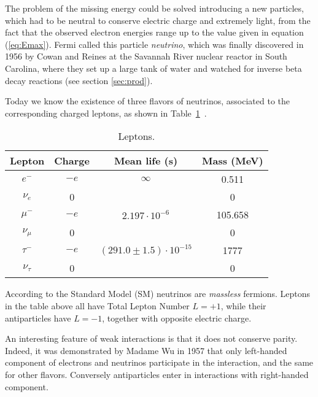 \documentclass{subnucbo}
\begin{document}
The problem of the missing energy could be solved introducing a new particles, which had to be neutral to conserve electric charge and extremely light, from the fact that the observed electron energies range up to the value given in equation (\ref{eq:Emax}).
Fermi called this particle \emph{neutrino}, which was finally discovered in 1956 by Cowan and Reines at the Savannah River nuclear reactor in South Carolina, where they set up a large tank of water and watched for inverse beta decay reactions (see section \ref{sec:prod}).

Today we know the existence of three flavors of neutrinos, associated to the corresponding charged leptons, as shown in Table~\ref{tab:classification}~\cite{ref:cott}.
\begin{table}[H]
\begin{tabular}{cccc}
\toprule
Lepton & Charge & Mean life (s) & Mass (MeV)\\
\midrule
$e^-$ & $-e$ & $\infty$ & 0.511\\
$\nu_e$ & 0 &  & 0\\
$\mu^-$ & $-e$ & $2.197\cdot10^{-6}$ & 105.658\\
$\nu_\mu$ & 0 & & 0\\
$\tau^-$ & $-e$ & $(291.0\pm1.5)\cdot10^{-15}$ & 1777\\
$\nu_\tau$ & 0 &  & 0\\
\bottomrule
\end{tabular}
\caption{Leptons.}
\label{tab:classification}
\end{table}
 
According to the Standard Model (SM) neutrinos are \emph{massless} fermions. Leptons in the table above all have Total Lepton Number $L=+1$, while their antiparticles have $L=-1$, together with opposite electric charge.

An interesting feature of weak interactions is that it does not conserve parity. Indeed, it was demonstrated by Madame Wu in 1957 that only left-handed component of electrons and neutrinos participate in the interaction, and the same for other flavors. Conversely antiparticles enter in interactions with right-handed component.
\end{document}
